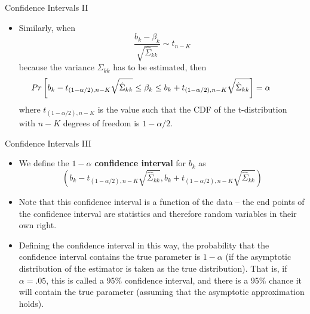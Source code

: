 \begin{frame}{Confidence Intervals II}
\begin{itemize}
	\item Similarly, when \[
		\frac{b_k - \beta_k}{\sqrt{\hat{\Sigma}_{kk}}} \sim t_{n-K}
	\]
	because the variance $\Sigma_{kk}$ has to be estimated, then
 \[
	\hspace*{-1cm} Pr\left[ b_{k} - t_{\left(1-\alpha/2\right),n-K} \sqrt{\hat{\Sigma}_{kk}} \le \beta_k \le b_k +  t_{\left(1-\alpha/2\right),n-K}  \sqrt{\hat{\Sigma}_{kk}}  \right] =\alpha 
	\]
	where $ t_{\left(1-\alpha/2\right),n-K} $ is the value such that the CDF of the t-distribution with $n-K$ degrees of freedom is $1-\alpha/2$. 	

\end{itemize}
\end{frame}



\begin{frame}{Confidence Intervals III}
\begin{itemize}
	\item We define the $1-\alpha$ {\bf confidence interval} for $b_{k}$ as \[
	\left(b_{k} - t_{\left(1-\alpha/2\right),n-K} \sqrt{\hat{\Sigma}_{kk}} , b_k +  t_{\left(1-\alpha/2\right),n-K}  \sqrt{\hat{\Sigma}_{kk}} \right)
	\]

	\smallskip
	\item Note that this confidence interval is a function of the data -- the end points of the confidence interval 
	are statistics and therefore random variables in their own right. 

	\smallskip
	\item Defining the confidence interval in this way, the probability that the confidence interval contains
	the true parameter is $1-\alpha$ (if the asymptotic distribution of the estimator is taken as the true distribution). 
	That is, if $\alpha=.05$, this is called a 95\% confidence interval, and there
	is a 95\% chance it will contain the true parameter (assuming that the asymptotic approximation holds). 

\end{itemize}
\end{frame}


